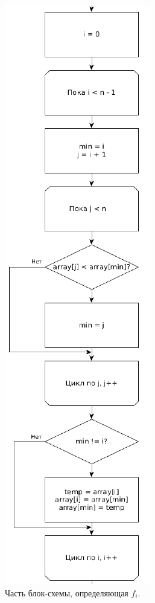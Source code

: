 \documentclass[12pt]{report}
\begin{document}
\begin{figure}
\begin{center}
\includegraphics[scale=0.5]{inc/img/selectionfi.png}
\captionsetup{justification=centering}
	\caption{Часть блок-схемы, определяющая $f_{i}$.}
	\label{img:selection:fi}	
\end{center}
\end{figure}
\newpage 
\end{document}
